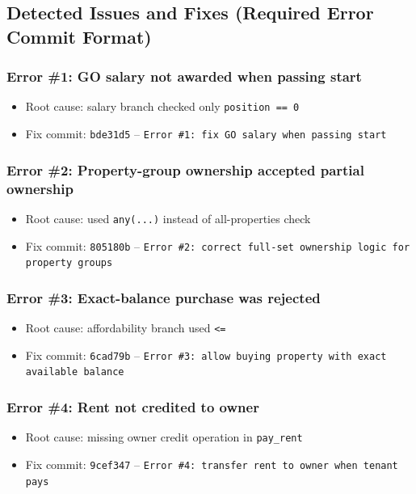 \documentclass[11pt,a4paper]{article}
\begin{document}
\subsection*{Detected Issues and Fixes (Required Error Commit Format)}

\subsubsection*{Error \#1: GO salary not awarded when passing start}
\begin{itemize}
  \item Root cause: salary branch checked only \texttt{position == 0}
  \item Fix commit: \texttt{bde31d5} -- \texttt{Error \#1: fix GO salary when passing start}
\end{itemize}

\subsubsection*{Error \#2: Property-group ownership accepted partial ownership}
\begin{itemize}
  \item Root cause: used \texttt{any(...)} instead of all-properties check
  \item Fix commit: \texttt{805180b} -- \texttt{Error \#2: correct full-set ownership logic for property groups}
\end{itemize}

\subsubsection*{Error \#3: Exact-balance purchase was rejected}
\begin{itemize}
  \item Root cause: affordability branch used \texttt{<=}
  \item Fix commit: \texttt{6cad79b} -- \texttt{Error \#3: allow buying property with exact available balance}
\end{itemize}

\subsubsection*{Error \#4: Rent not credited to owner}
\begin{itemize}
  \item Root cause: missing owner credit operation in \texttt{pay\_rent}
  \item Fix commit: \texttt{9cef347} -- \texttt{Error \#4: transfer rent to owner when tenant pays}
\end{itemize}
\end{document}
